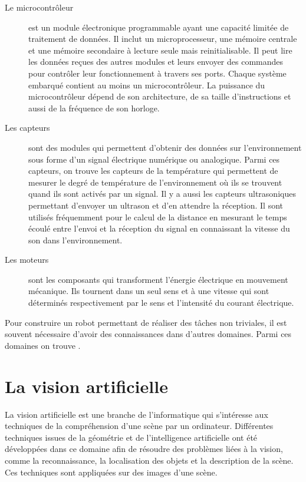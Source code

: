 \begin{description}
  \item[Le microcontrôleur] est un module électronique programmable ayant une
  capacité limitée de traitement de données. Il inclut un microprocesseur, une
  mémoire centrale et une mémoire secondaire à lecture seule mais reinitialisable.
  Il peut lire les données reçues des autres modules et leurs envoyer des commandes
  pour contrôler leur fonctionnement à travers ses ports. Chaque système embarqué
  contient au moins un microcontrôleur. La puissance du microcontrôleur
  dépend de son architecture, de sa taille d'instructions et aussi de la fréquence
  de son horloge.
  \item[Les capteurs] sont des modules qui permettent d'obtenir des données sur
  l'environnement sous forme d'un signal électrique numérique ou analogique.
  Parmi ces capteurs, on trouve les capteurs de la température qui permettent de
  mesurer le degré de température de l'environnement où ils se trouvent quand ils
  sont activés par un signal.
  Il y a aussi les capteurs ultrasoniques permettant d'envoyer un ultrason et
  d'en attendre la réception.
  Il sont utilisés fréquemment pour le calcul de la distance en mesurant le
  temps écoulé entre l'envoi et la réception du signal en connaissant la vitesse
  du son dans l'environnement.
  \item[Les moteurs] sont les composants qui transforment l'énergie électrique en
  mouvement mécanique. Ils tournent dans un seul sens et à une vitesse qui
  sont déterminés respectivement par le sens et l'intensité du courant électrique.
\end{description}

Pour construire un robot permettant de réaliser des tâches non triviales, il est
souvent nécessaire d'avoir des connaissances dans d'autres domaines. Parmi ces
domaines on trouve .

\section{La vision artificielle}

La vision artificielle est une branche de l'informatique qui s'intéresse aux
techniques de la compréhension d'une scène par un ordinateur. Différentes
techniques issues de la géométrie et de l'intelligence artificielle ont été
développées dans ce domaine afin de résoudre des problèmes liées à la vision,
comme la reconnaissance, la localisation des objets et la description de
la scène. Ces techniques sont appliquées sur des images d'une scène.


